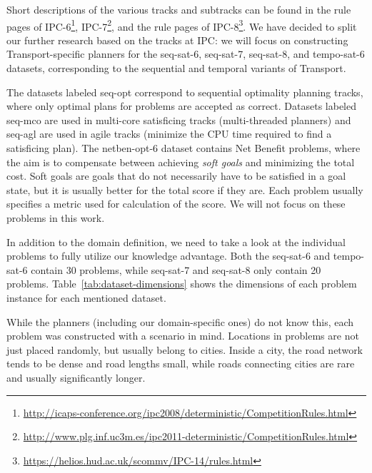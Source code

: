 Short descriptions of the various tracks and subtracks can be found in the rule pages of IPC-6\footnote{\url{http://icaps-conference.org/ipc2008/deterministic/CompetitionRules.html}},
IPC-7\footnote{\url{http://www.plg.inf.uc3m.es/ipc2011-deterministic/CompetitionRules.html}},
and the rule pages of IPC-8\footnote{\url{https://helios.hud.ac.uk/scommv/IPC-14/rules.html}}.
We have decided to split our further research based on the tracks at IPC: we will focus on constructing
Transport-specific planners for the seq-sat-6, seq-sat-7, seq-sat-8, and tempo-sat-6 datasets,
corresponding to the sequential and temporal variants of Transport.

The datasets labeled seq-opt correspond to sequential optimality planning tracks,
where only optimal plans for problems are accepted as correct.
Datasets labeled seq-mco are used in multi-core satisficing tracks (multi-threaded planners)
and seq-agl are used in agile tracks (minimize the CPU time required to find a satisficing plan).
The netben-opt-6 dataset contains Net Benefit problems, where the aim
is to compensate between achieving \textit{soft goals} and minimizing the total cost.
Soft goals are goals that do not necessarily have to be satisfied in a goal state,
but it is usually better for the total score if they are.
Each problem usually specifies a metric used for calculation of the score.
We will not focus on 
these problems in this work.

In addition to the domain definition, we need to take a look at the individual problems to fully utilize our knowledge advantage.
Both the seq-sat-6 and tempo-sat-6 contain 30 problems, while seq-sat-7 and seq-sat-8 only contain 20 problems. Table~\ref{tab:dataset-dimensions} shows the
dimensions of each problem instance for each mentioned dataset.

While the planners (including our domain-specific ones) do not know this,
each problem was constructed with a scenario in mind. Locations in problems are not just
placed randomly, but usually belong to cities. Inside a city, the road network
tends to be dense and road lengths small, while roads connecting cities
are rare and usually significantly longer.


